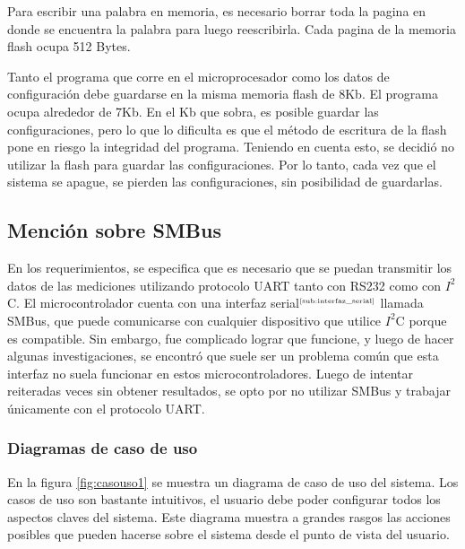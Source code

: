 Para escribir una palabra en memoria, es necesario borrar toda la pagina en donde se encuentra la palabra para luego reescribirla. Cada pagina de la memoria flash ocupa 512 Bytes.

Tanto el programa que corre en el microprocesador como los datos de configuración debe guardarse en la misma memoria flash de 8Kb. El programa ocupa alrededor de 7Kb. En el Kb que sobra, es posible guardar las configuraciones, pero lo que lo dificulta es que el método de escritura de la flash pone en riesgo la integridad del programa. Teniendo en cuenta esto, se decidió no utilizar la flash para guardar las configuraciones. Por lo tanto, cada vez que el sistema se apague, se pierden las configuraciones, sin posibilidad de guardarlas.


\subsection{Mención sobre SMBus} %
\label{sub:mencion_sobre_smbus}

En los requerimientos, se especifica que es necesario que se puedan transmitir los datos de las mediciones utilizando protocolo UART tanto con RS232 como con $I^{2}$C. El microcontrolador cuenta con una interfaz serial$^{\tiny{\ref{sub:interfaz_serial}}}$ llamada SMBus, que puede comunicarse con cualquier dispositivo que utilice $I^{2}$C porque es compatible. Sin embargo, fue complicado lograr que funcione, y luego de hacer algunas investigaciones, se encontró que suele ser un problema común que esta interfaz no suela funcionar en estos microcontroladores. Luego de intentar reiteradas veces sin obtener resultados, se opto por no utilizar SMBus y trabajar únicamente con el protocolo UART.





\subsubsection{Diagramas de caso de uso} %
\label{ssub:diagramas_de_caso_de_uso}

En la figura \ref{fig:casouso1} se muestra un diagrama de caso de uso del sistema. Los casos de uso son bastante intuitivos, el usuario debe poder configurar todos los aspectos claves del sistema. Este diagrama muestra a grandes rasgos las acciones posibles que pueden hacerse sobre el sistema desde el punto de vista del usuario.

